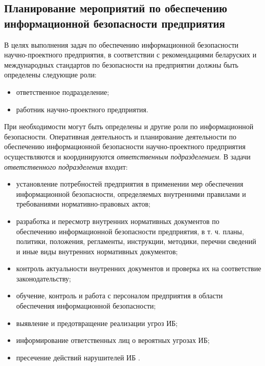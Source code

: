\subsection{Планирование мероприятий по обеспечению информационной безопасности предприятия}
\label{subsec:mechanisms:planning}

В целях выполнения задач по обеспечению информационной безопасности научно-проектного предприятия, в соответствии с рекомендациями беларуских и международных стандартов по безопасности на предприятии должны быть определены следующие роли:
\begin{itemize}
	\item ответственное подразделение;
	\item работник научно-проектного предприятия.
\end{itemize}

При необходимости могут быть определены и другие роли по информационной безопасности.
Оперативная деятельность и планирование деятельности по обеспечению информационной безопасности научно-проектного предприятия осуществляются и координируются \textit{ответственным подразделением}.
В задачи \textit{ответственного подразделения} входит:
\begin{itemize}
	\item установление потребностей предприятия в применении мер обеспечения информационной безопасности, определяемых внутренними правилами и требованиями нормативно-правовых актов;
	\item разработка и пересмотр внутренних нормативных документов по обеспечению информационной безопасности предприятия, в т. ч. планы, политики, положения, регламенты, инструкции, методики, перечни сведений и иные виды внутренних нормативных документов;
	\item контроль актуальности внутренних документов и проверка их на соответствие законодательству;
	\item обучение, контроль и работа с персоналом предприятия в области обеспечения информационной безопасности;
	\item выявление и предотвращение реализации угроз ИБ;
	\item информирование ответственных лиц о вероятных угрозах ИБ;
	\item пресечение действий нарушителей ИБ \cite{bsmu_privacy}.
\end{itemize}

